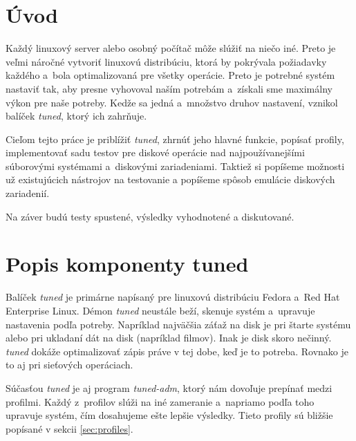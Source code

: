 %
%

\chapter{Úvod}

Každý linuxový server alebo osobný počítač môže slúžiť na niečo iné. Preto je
veľmi náročné vytvoriť linuxovú distribúciu, ktorá by pokrývala požiadavky
každého a~bola optimalizovaná pre všetky operácie. Preto je potrebné systém
nastaviť tak, aby presne vyhovoval naším potrebám a~získali sme maximálny výkon
pre naše potreby. Kedže sa jedná a~množstvo druhov nastavení, vznikol balíček
\emph{tuned}\cite{tunedHomepage}, ktorý ich zahrňuje.

Cieľom tejto práce je priblížiť \emph{tuned}, zhrnúť jeho hlavné funkcie,
popísať profily, implementovať sadu testov pre diskové operácie nad
najpoužívanejšími súborovými systémami a~diskovými zariadeniami. Taktiež si
popíšeme možnosti už existujúcich nástrojov na testovanie a popíšeme spôsob
emulácie diskových zariadenií.

Na záver budú testy spustené, výsledky vyhodnotené a diskutované.

%
%

\chapter{Popis komponenty tuned}

Balíček \emph{tuned} je primárne napísaný pre linuxovú distribúciu
Fedora\cite{fedoraHomepage} a~Red Hat Enterprise Linux. Démon \emph{tuned} neustále
beží, skenuje systém a~upravuje nastavenia podľa potreby. Napríklad najväčšia
záťaž na disk je pri štarte systému alebo pri ukladaní dát na disk (napríklad
filmov). Inak je disk skoro nečinný. \emph{tuned} dokáže optimalizovať zápis práve v
tej dobe, keď je to potreba. Rovnako je to aj pri sieťových operáciach.


Súčasťou \emph{tuned} je aj program \emph{tuned-adm}, ktorý nám dovoľuje
prepínať medzi profilmi. Každý z~profilov slúži na iné zameranie a~napriamo
podľa toho upravuje systém, čím dosahujeme ešte lepšie výsledky. Tieto profily
sú bližšie popísané v sekcii \ref{sec:profiles}.

